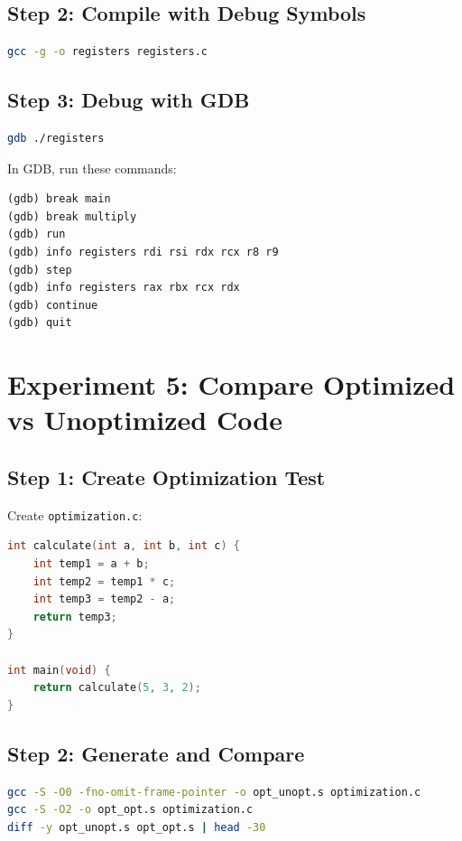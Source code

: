 \subsection{Step 2: Compile with Debug Symbols}

\begin{lstlisting}[language=bash]
gcc -g -o registers registers.c
\end{lstlisting}

\subsection{Step 3: Debug with GDB}

\begin{lstlisting}[language=bash]
gdb ./registers
\end{lstlisting}

In GDB, run these commands:

\begin{lstlisting}
(gdb) break main
(gdb) break multiply
(gdb) run
(gdb) info registers rdi rsi rdx rcx r8 r9
(gdb) step
(gdb) info registers rax rbx rcx rdx
(gdb) continue
(gdb) quit
\end{lstlisting}

\section{Experiment 5: Compare Optimized vs Unoptimized Code}

\subsection{Step 1: Create Optimization Test}

Create \texttt{optimization.c}:

\begin{lstlisting}[language=C]
int calculate(int a, int b, int c) {
    int temp1 = a + b;
    int temp2 = temp1 * c;
    int temp3 = temp2 - a;
    return temp3;
}

int main(void) {
    return calculate(5, 3, 2);
}
\end{lstlisting}

\subsection{Step 2: Generate and Compare}

\begin{lstlisting}[language=bash]
gcc -S -O0 -fno-omit-frame-pointer -o opt_unopt.s optimization.c
gcc -S -O2 -o opt_opt.s optimization.c
diff -y opt_unopt.s opt_opt.s | head -30
\end{lstlisting}

